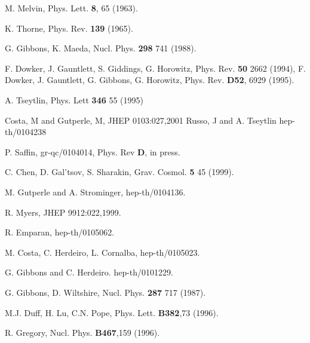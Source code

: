 \documentclass[a4paper,11pt]{article}
\begin{document}
\begin{thebibliography}{99}
M. Melvin,
Phys. Lett. {\bf 8}, 65 (1963).

K. Thorne, Phys. Rev. {\bf 139} (1965).

G. Gibbons, K. Maeda, Nucl. Phys. {\bf 298} 741 (1988).

F. Dowker, J. Gauntlett, S. Giddings, G. Horowitz,
Phys. Rev. {\bf 50} 2662 (1994), 
F. Dowker, J. Gauntlett, G. Gibbons, G. Horowitz,
Phys. Rev. {\bf D52}, 6929 (1995).

A. Tseytlin, Phys. Lett {\bf 346} 55 (1995)

Costa, M and Gutperle, M,
JHEP 0103:027,2001 
Russo, J and A. Tseytlin
hep-th/0104238

P. Saffin, gr-qc/0104014, 
Phys. Rev {\bf D}, in press.

C. Chen, D. Gal'tsov, S. Sharakin,
Grav. Cosmol. {\bf 5} 45 (1999). 

M. Gutperle and A. Strominger,
hep-th/0104136.

R. Myers,
JHEP 9912:022,1999.

R. Emparan,
hep-th/0105062.

M. Costa, C. Herdeiro, L. Cornalba,
hep-th/0105023.

G. Gibbons and C. Herdeiro. hep-th/0101229.

G. Gibbons, D. Wiltshire, Nucl. Phys. {\bf 287} 717 (1987).

M.J. Duff, H. Lu, C.N. Pope,
Phys. Lett. {\bf B382},73 (1996).

R. Gregory,
Nucl. Phys. {\bf B467},159 (1996). 


\end{thebibliography}
\end{document}
